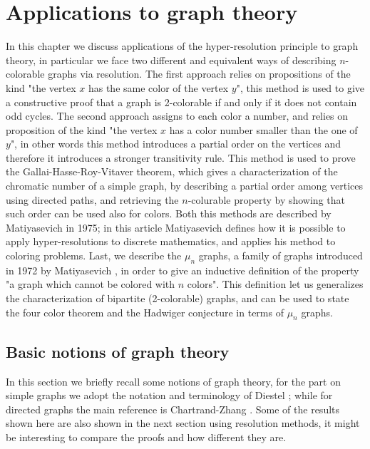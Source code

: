 \documentclass[a4paper,12pt,oneside]{book}
\begin{document}
\chapter{Applications to graph theory}%
In this chapter we discuss applications of the hyper-resolution principle to graph theory, in particular we  face two different and equivalent ways of describing $n$-colorable graphs via resolution. The first approach relies on propositions of the kind "the vertex $x$ has the same color of the vertex $y$", this method is used to give a constructive proof that a graph is 2-colorable if and only if it does not contain odd cycles. The second approach assigns to each color a number, and relies on proposition of the kind "the vertex $x$ has a color number smaller than the one of $y$", in other words this method introduces a partial order on the vertices and therefore it introduces a stronger transitivity rule. This method is used to prove the Gallai-Hasse-Roy-Vitaver theorem, which gives a characterization of the chromatic number of a simple graph, by describing a partial order among vertices using directed paths, and retrieving the $n$-colurable property by showing that such order can be used also for colors. 
Both this methods are described by Matiyasevich in 1975\cite{mat-1}; in this article Matiyasevich defines how it is possible to apply hyper-resolutions to discrete mathematics, and applies his method to coloring problems.
Last, we describe the $\mu_n$ graphs, a family of graphs introduced in 1972 by Matiyasevich \cite{mat-2}, in order to give an inductive definition of the property "a graph which cannot be colored with $n$ colors". This definition let us generalizes the characterization of bipartite (2-colorable) graphs, and can be used to state the four color theorem and the Hadwiger conjecture in terms of $\mu_n$ graphs.


\section{Basic notions of graph theory}

In this section we briefly recall some notions of graph theory, for the part on simple graphs we adopt the notation and terminology of Diestel \cite{diestel}; while for directed graphs the main reference is Chartrand-Zhang \cite{chrom}. Some of the results shown here are also shown in the next section using resolution methods, it might be interesting to compare the proofs and how different they are.
\end{document}

